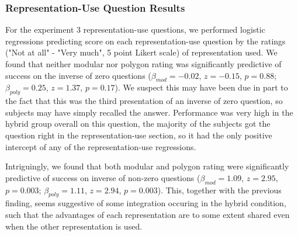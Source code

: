 \documentclass[man,10pt]{apa6}
\begin{document}
\subsubsection{Representation-Use Question Results}
For the experiment 3 representation-use questions, we performed logistic regressions predicting score on each representation-use question by the ratings ("Not at all" - "Very much", 5 point Likert scale) of representation used. We found that neither modular nor polygon rating was significantly predictive of success on the inverse of zero questions ($\beta_{mod} = -0.02$, $z = -0.15$, $p = 0.88$; $\beta_{poly} = 0.25$, $z = 1.37$, $p = 0.17$). We suspect this may have been due in part to the fact that this was the third presentation of an inverse of zero question, so subjects may have simply recalled the answer. Performance was very high in the hybrid group overall on this question, the majority of the subjects got the question right in the representation-use section, so it had the only positive intercept of any of the representation-use regressions.\par 
Intriguingly, we found that both modular and polygon rating were significantly predictive of success on inverse of non-zero questions ($\beta_{mod} = 1.09$, $z = 2.95$, $p = 0.003$; $\beta_{poly} = 1.11$, $z = 2.94$, $p = 0.003$). This, together with the previous finding, seems suggestive of some integration occuring in the hybrid condition, such that the advantages of each representation are to some extent shared even when the other representation is used. 
\end{document}
